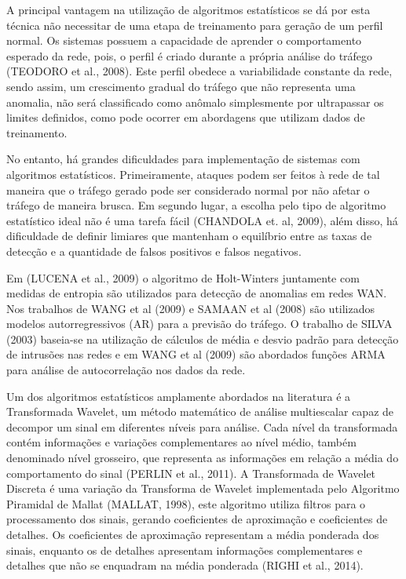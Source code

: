 \indent A principal vantagem na utilização de algoritmos estatísticos se dá por esta técnica não necessitar de uma etapa de treinamento para geração de um perfil normal. Os sistemas possuem a capacidade de aprender o comportamento esperado da rede, pois, o perfil é criado durante a própria análise do tráfego (TEODORO et al., 2008). Este perfil obedece a variabilidade constante da rede, sendo assim, um crescimento gradual do tráfego que não representa uma anomalia, não será classificado como anômalo simplesmente por ultrapassar os limites definidos, como pode ocorrer em abordagens que utilizam dados de treinamento.

\indent No entanto, há grandes dificuldades para implementação de sistemas com algoritmos estatísticos. Primeiramente, ataques podem ser feitos à rede de tal maneira que o tráfego gerado pode ser considerado normal por não afetar o tráfego de maneira brusca. Em segundo lugar, a escolha pelo tipo de algoritmo estatístico ideal não é uma tarefa fácil (CHANDOLA et. al, 2009), além disso, há dificuldade de definir limiares que mantenham o equilíbrio entre as taxas de detecção e a quantidade de falsos positivos e falsos negativos.

\indent Em (LUCENA et al., 2009) o algoritmo de Holt-Winters juntamente com medidas de entropia são utilizados para detecção de anomalias em redes WAN. Nos trabalhos de WANG et al (2009) e SAMAAN et al (2008) são utilizados modelos autorregressivos (AR) para a previsão do tráfego. O trabalho de SILVA (2003) baseia-se na utilização de cálculos de média e desvio padrão para detecção de intrusões nas redes e em WANG et al (2009) são abordados funções ARMA para análise de autocorrelação nos dados da rede.

\indent Um dos algoritmos estatísticos amplamente abordados na literatura é a Transformada Wavelet, um método matemático de análise multiescalar capaz de decompor um sinal em diferentes níveis para análise. Cada nível da transformada contém informações e variações complementares ao nível médio, também denominado nível grosseiro, que representa as informações em relação a média do comportamento do sinal (PERLIN et al., 2011). A Transformada de Wavelet Discreta é uma variação da Transforma de Wavelet implementada pelo Algoritmo Piramidal de Mallat (MALLAT, 1998), este algoritmo utiliza filtros para o processamento dos sinais, gerando coeficientes de aproximação e coeficientes de detalhes. Os coeficientes de aproximação representam a média ponderada dos sinais, enquanto os de detalhes apresentam informações complementares e detalhes que não se enquadram na média ponderada (RIGHI et al., 2014).

